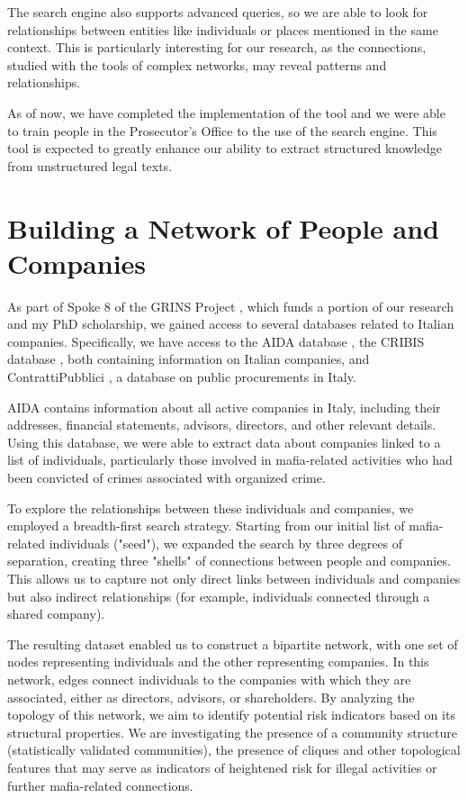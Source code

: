 \documentclass[a4paper, 10pt]{scrartcl}
\begin{document}
The search engine also supports advanced queries, so we are able to look for relationships between entities like individuals or places mentioned in the same context. This is particularly interesting for our research, as the connections, studied with the tools of complex networks, may reveal patterns and relationships.

As of now, we have completed the implementation of the tool and we were able to train people in the Prosecutor's Office to the use of the search engine. This tool is expected to greatly enhance our ability to extract structured knowledge from unstructured legal texts.

\section{Building a Network of People and Companies}

As part of Spoke 8 of the GRINS Project \cite{noauthor_grins_nodate}, which funds a portion of our research and my PhD scholarship, we gained access to several databases related to Italian companies. Specifically, we have access to the AIDA database \cite{noauthor_aida_nodate}, the CRIBIS database \cite{noauthor_cribis:_nodate}, both containing information on Italian companies, and ContrattiPubblici \cite{noauthor_il_nodate}, a database on public procurements in Italy.

AIDA contains information about all active companies in Italy, including their addresses, financial statements, advisors, directors, and other relevant details. Using this database, we were able to extract data about companies linked to a list of individuals, particularly those involved in mafia-related activities who had been convicted of crimes associated with organized crime.

To explore the relationships between these individuals and companies, we employed a breadth-first search strategy. Starting from our initial list of mafia-related individuals ("seed"), we expanded the search by three degrees of separation, creating three "shells" of connections between people and companies. This allows us to capture not only direct links between individuals and companies but also indirect relationships (for example, individuals connected through a shared company).

The resulting dataset enabled us to construct a bipartite network, with one set of nodes representing individuals and the other representing companies. In this network, edges connect individuals to the companies with which they are associated, either as directors, advisors, or shareholders. By analyzing the topology of this network, we aim to identify potential risk indicators based on its structural properties. We are investigating the presence of a community structure (statistically validated communities), the presence of cliques and other topological features that may serve as indicators of heightened risk for illegal activities or further mafia-related connections.
\end{document}
